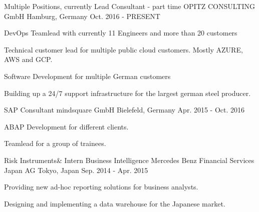 

\begin{cventries}

  \cventry
    {Multiple Positions, currently Lead Consultant - part time} %
    {OPITZ CONSULTING GmbH} %
    {Hamburg, Germany} %
    {Oct. 2016 - PRESENT} %
    {
      \begin{cvitems}
        \item {DevOps Teamlead with currently 11 Engineers and more than 20 customers}
        \item {Technical customer lead for multiple public cloud customers. Mostly AZURE, AWS and GCP.}
        \item {Software Development for multiple German customers}
        \item {Building up a 24/7 support infrastructure for the largest german steel producer.}
      \end{cvitems}
    }

\cventry
{SAP Consultant} %
{mindsquare GmbH} %
{Bielefeld, Germany} %
{Apr. 2015 - Oct. 2016} %
{
  \begin{cvitems}
    \item {ABAP Development for different clients. }
    \item {Teamlead for a group of trainees. }
  \end{cvitems}
}

  \cventry
    {Risk Instruments\& Intern Business Intelligence} %
    {Mercedes Benz Financial Services Japan AG} %
    {Tokyo, Japan} %
    {Sep. 2014 - Apr. 2015} %
    {
      \begin{cvitems} %
        \item {Providing new ad-hoc reporting solutions for business analysts.}
        \item {Designing and implementing a data warehouse for the Japanese market.}
      \end{cvitems}
    }


\end{cventries}
